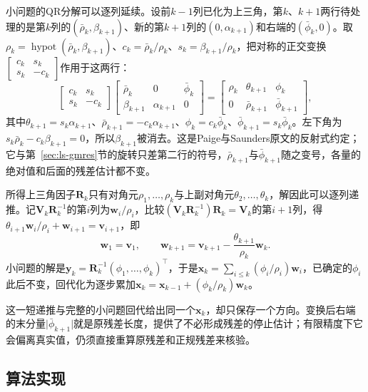 小问题的QR分解可以逐列延续。设前$k-1$列已化为上三角，第$k$、$k+1$两行待处理的是第$k$列的$(\bar\rho_k,\beta_{k+1})$、新的第$k+1$列的$(0,\alpha_{k+1})$和右端的$(\bar\phi_k,0)$。取$\rho_k=\operatorname{hypot}(\bar\rho_k,\beta_{k+1})$、$c_k=\bar\rho_k/\rho_k$、$s_k=\beta_{k+1}/\rho_k$，把对称的正交变换$\left[\begin{smallmatrix}c_k&s_k\\s_k&-c_k\end{smallmatrix}\right]$作用于这两行：
\[
 \begin{bmatrix}c_k&s_k\\s_k&-c_k\end{bmatrix}
 \begin{bmatrix}\bar\rho_k&0&\bar\phi_k\\\beta_{k+1}&\alpha_{k+1}&0\end{bmatrix}
 =\begin{bmatrix}\rho_k&\theta_{k+1}&\phi_k\\0&\bar\rho_{k+1}&\bar\phi_{k+1}\end{bmatrix},
\]
其中$\theta_{k+1}=s_k\alpha_{k+1}$、$\bar\rho_{k+1}=-c_k\alpha_{k+1}$、$\phi_k=c_k\bar\phi_k$、$\bar\phi_{k+1}=s_k\bar\phi_k$。左下角为$s_k\bar\rho_k-c_k\beta_{k+1}=0$，所以$\beta_{k+1}$被消去。这是Paige与Saunders原文的反射式约定；它与第~\ref{sec:ls-gmres}节的旋转只差第二行的符号，$\bar\rho_{k+1}$与$\bar\phi_{k+1}$随之变号，各量的绝对值和后面的残差估计都不变。

所得上三角因子$\bm R_k$只有对角元$\rho_1,\ldots,\rho_k$与上副对角元$\theta_2,\ldots,\theta_k$，解因此可以逐列递推。记$\bm V_k\bm R_k^{-1}$的第$i$列为$\bm w_i/\rho_i$，比较$(\bm V_k\bm R_k^{-1})\bm R_k=\bm V_k$的第$i+1$列，得$\theta_{i+1}\bm w_i/\rho_i+\bm w_{i+1}=\bm v_{i+1}$，即
\[
 \bm w_1=\bm v_1,\qquad \bm w_{k+1}=\bm v_{k+1}-\frac{\theta_{k+1}}{\rho_k}\bm w_k .
\]
小问题的解是$\bm y_k=\bm R_k^{-1}(\phi_1,\ldots,\phi_k)^\top$，于是$\bm x_k=\sum_{i\le k}(\phi_i/\rho_i)\bm w_i$，已确定的$\phi_i$此后不变，回代化为逐步累加$\bm x_k=\bm x_{k-1}+(\phi_k/\rho_k)\bm w_k$。

这一短递推与完整的小问题回代给出同一个$\bm x_k$，却只保存一个方向。变换后右端的末分量$\lvert\bar\phi_{k+1}\rvert$就是原残差长度，提供了不必形成残差的停止估计；有限精度下它会偏离真实值，仍须直接重算原残差和正规残差来核验。

\subsection{算法实现}

